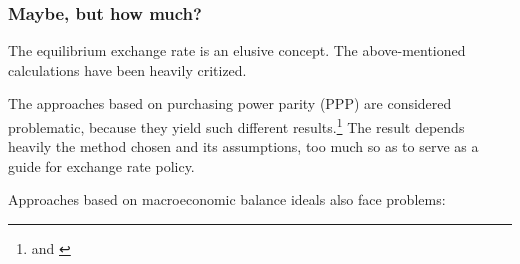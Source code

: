 
\subsubsection{Maybe, but how much?}

The equilibrium exchange rate is an elusive concept. The above-mentioned calculations have been heavily critized.

The approaches based on purchasing power parity (PPP) are considered problematic, because they yield such different results.\footnote{\cite[p. 16]{Yu2010} and \cite[pp. 82]{CheungChinn2010}} The result depends heavily the method chosen and its assumptions, too much so as to serve as a guide for exchange rate policy.

Approaches based on macroeconomic balance ideals also face problems: 







